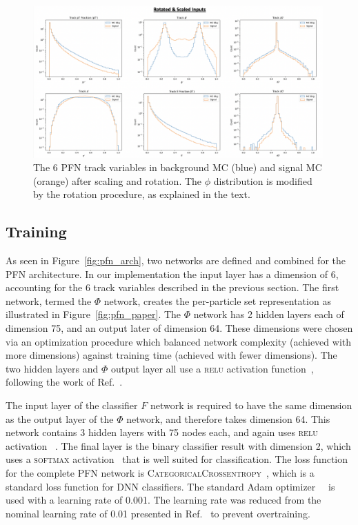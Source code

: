 \begin{figure}[!htbp]
    \centering
    \includegraphics[width=0.99\textwidth]{figures/ml/pfn_bkgsig_input_rot}
     \caption{The 6 PFN track variables in background MC (blue) and signal MC (orange) after scaling and rotation. The $\phi$ distribution is modified by the rotation procedure, as explained in the text.}
     \label{fig:pfn_bkgsig_input_rot}
\end{figure}

\clearpage

\subsection{Training}
\label{sec:pfn_training}

As seen in Figure~\ref{fig:pfn_arch}, two networks are defined and combined for the PFN architecture. In our implementation the input layer has a dimension of 6, accounting for the 6 track variables described in the previous section. The first network, termed the $\Phi$ network, creates the per-particle set representation as illustrated in Figure~\ref{fig:pfn_paper}. The $\Phi$ network has 2 hidden layers each of dimension 75, and an output later of dimension 64. These dimensions were chosen via an optimization procedure which balanced network complexity (achieved with more dimensions) against training time (achieved with fewer dimensions). The two hidden layers and $\Phi$ output layer all use a \textsc{relu} activation function~\cite{scikit-learn}, following the work of Ref.~\cite{pfn}. 

The input layer of the classifier $F$ network is required to have the same dimension as the output layer of the $\Phi$ network, and therefore takes dimension 64. This network contains 3 hidden layers with 75 nodes each, and again uses \textsc{relu} activation~\cite{scikit-learn} . The final layer is the binary classifier result with dimension 2, which uses a \textsc{softmax} activation~\cite{scikit-learn} that is well suited for classification. The loss function for the complete PFN network is \textsc{CategoricalCrossentropy}~\cite{scikit-learn}, which is a standard loss function for DNN classifiers. The standard Adam optimizer~\cite{adam}~\cite{scikit-learn} is used with a learning rate of 0.001. The learning rate was reduced from the nominal learning rate of 0.01 presented in Ref.~\cite{pfn} to prevent overtraining.\par

